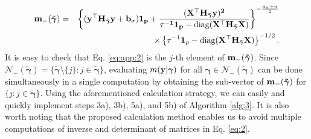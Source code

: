 \documentclass[twocolumn]{svjour3}       %
\newcommand{\T}{\top} %
\newcommand{\uH}{\bf H} %
\newcommand{\uX}{\bf X} %
\newcommand{\uy}{\bf y} %
\newcommand{\um}{\bf m} %
\newcommand{\0}{\boldsymbol 0} %
\newcommand{\1}{\boldsymbol 1} %
\newcommand{\bg}{\boldsymbol \gamma} %
\newcommand{\diag}{\rm diag}
\begin{document}
\begin{eqnarray*}
\um_-({\tilde{\bg}}) &=& \left\{(\uy^{\T}\uH_{\tilde{\bg}}\uy+b_{\sigma}) \1_p+\frac{(\uX^{\T}\uH_{\tilde{\bg}}\uy)^2}{\tau^{-1}\1_p-\diag(\uX^{\T}\uH_{\tilde{\bg}}\uX) } \right\}^
 {-\frac{a_{\sigma}+n}{2}}\\
 &&\times\left\{\tau^{-1} \1_p  -\diag(\uX^{\T}\uH_{\tilde{\bg}}\uX) \right\}^{-1/2}.
 \end{eqnarray*}
It is easy to check that Eq. \eqref{eq:app:2} is the $j$-th element of $\um_-({\tilde{\bg}})$. Since $\mathcal{N}_-(\tilde{\bg})=\{\tilde{\bg} \setminus \{j\}:j\in \tilde{\bg} \}$, evaluating $m(\uy|\bg)$ for all $\bg \in \mathcal{N}_-(\tilde{\bg} )$ can be done simultaneously in a single computation by obtaining the sub-vector of $\um_-({\tilde{\bg}})$ for $\{j :j \in \tilde{\bg} \}$. Using the aforementioned calculation strategy, we can easily and quickly implement steps 3a), 3b), 5a), and 5b) of Algorithm \ref{alg:3}. It is also worth noting that the proposed calculation method enables us to avoid multiple computations of inverse and determinant of matrices in Eq. \eqref{eq:2}.
\end{document}
